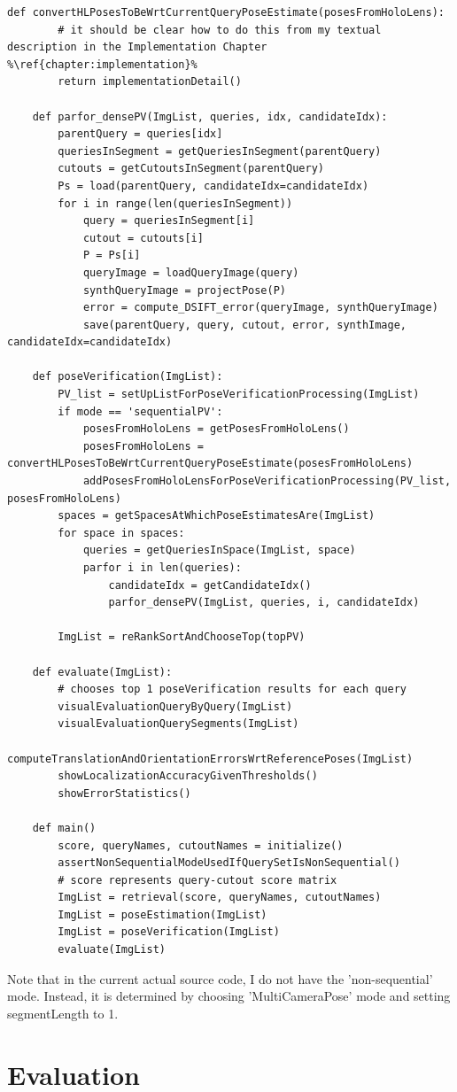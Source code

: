 \documentclass[twoside]{ctuthesis}
\theoremstyle{plain}
\theoremstyle{definition}
\theoremstyle{note}
\newcommand{\todo}[1][]{%
\ifthenelse{\isempty{#1}}{\textbf{TODO}}{\textbf{TODO: #1}}%
}
\begin{document}
\begin{lstlisting}[style=pseudocode, caption={InLocCIIRC pseudocode. \todo[pseudocode review.]}]
	def convertHLPosesToBeWrtCurrentQueryPoseEstimate(posesFromHoloLens):
		# it should be clear how to do this from my textual description in the Implementation Chapter %\ref{chapter:implementation}%
		return implementationDetail()

	def parfor_densePV(ImgList, queries, idx, candidateIdx):
		parentQuery = queries[idx]
		queriesInSegment = getQueriesInSegment(parentQuery)
		cutouts = getCutoutsInSegment(parentQuery)
		Ps = load(parentQuery, candidateIdx=candidateIdx)
		for i in range(len(queriesInSegment))
			query = queriesInSegment[i]
			cutout = cutouts[i]
			P = Ps[i]
			queryImage = loadQueryImage(query)
			synthQueryImage = projectPose(P)
			error = compute_DSIFT_error(queryImage, synthQueryImage)
			save(parentQuery, query, cutout, error, synthImage, candidateIdx=candidateIdx)

	def poseVerification(ImgList):
		PV_list = setUpListForPoseVerificationProcessing(ImgList)
		if mode == 'sequentialPV':
			posesFromHoloLens = getPosesFromHoloLens()
			posesFromHoloLens = convertHLPosesToBeWrtCurrentQueryPoseEstimate(posesFromHoloLens)
			addPosesFromHoloLensForPoseVerificationProcessing(PV_list, posesFromHoloLens)
		spaces = getSpacesAtWhichPoseEstimatesAre(ImgList)
		for space in spaces:
			queries = getQueriesInSpace(ImgList, space)
			parfor i in len(queries):
				candidateIdx = getCandidateIdx()
				parfor_densePV(ImgList, queries, i, candidateIdx)

		ImgList = reRankSortAndChooseTop(topPV)

	def evaluate(ImgList):
		# chooses top 1 poseVerification results for each query
		visualEvaluationQueryByQuery(ImgList)
		visualEvaluationQuerySegments(ImgList)
		computeTranslationAndOrientationErrorsWrtReferencePoses(ImgList)
		showLocalizationAccuracyGivenThresholds()
		showErrorStatistics()

	def main()
		score, queryNames, cutoutNames = initialize()
		assertNonSequentialModeUsedIfQuerySetIsNonSequential()
		# score represents query-cutout score matrix
		ImgList = retrieval(score, queryNames, cutoutNames)
		ImgList = poseEstimation(ImgList)
		ImgList = poseVerification(ImgList)
		evaluate(ImgList)
\end{lstlisting}

Note that in the current actual source code, I do not have the 'non-sequential' mode. Instead, it is determined by choosing 'MultiCameraPose' mode and setting segmentLength to 1.

\chapter{Evaluation}
\label{chapter:evaluation}
\end{document}
